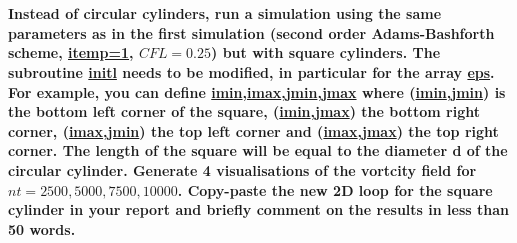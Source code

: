 \documentclass[10pt, a4paper]{article}
\begin{document}
\section{}
\textbf{Instead of circular cylinders, run a simulation using the same parameters as in the first simulation (second order Adams-Bashforth scheme, \url{itemp=1}, $CFL=0.25$) but with square cylinders. The subroutine \url{initl} needs to be modified, in particular for the array \url{eps}. For example, you can define \url{imin},\url{imax},\url{jmin},\url{jmax} where (\url{imin},\url{jmin}) is the bottom left corner of the square, (\url{imin},\url{jmax}) the bottom right corner, (\url{imax},\url{jmin}) the top left corner and (\url{imax},\url{jmax}) the top right corner. The length of the square will be equal to the diameter d of the circular cylinder. Generate 4 visualisations of the vortcity field for $nt = 2500, 5000, 7500, 10000$. Copy-paste the new 2D loop for the square cylinder in your report and briefly comment on the results in less than 50 words.}
\end{document}

